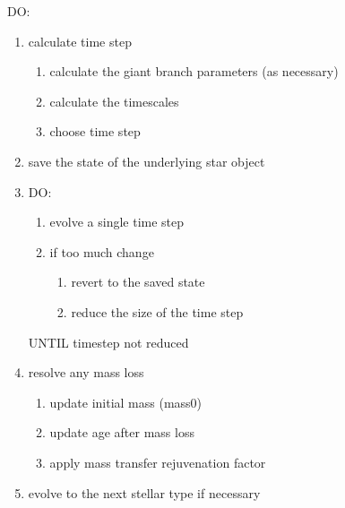\tabto{2em}DO:

\hfill
\begin{minipage}{\dimexpr\textwidth-4em}
    \begin{enumerate}
        \item {
            calculate time step
            \begin{enumerate}
                \item {calculate the giant branch parameters (as necessary)}
                \item {calculate the timescales}
                \item {choose time step}
            \end{enumerate}
        }
 
        \item {save the state of the underlying star object}

        \item {
            DO:

            \hfill
            \begin{minipage}{\dimexpr\textwidth-4em}
                \begin{enumerate}
                    \item {evolve a single time step}
                
                    \item {
                        if too much change
                        \begin{enumerate}
                        \item{revert to the saved state}
                        \item{reduce the size of the time step}
                        \end{enumerate}
                    }
                \end{enumerate}
            \end{minipage}

            UNTIL timestep not reduced
        }
  
        \item {
            resolve any mass loss
            \begin{enumerate}
                \item {update initial mass (mass0)}
                \item {update age after mass loss}
                \item {apply mass transfer rejuvenation factor}
            \end{enumerate}
        }
 
        \item { evolve to the next stellar type if necessary }

    \end{enumerate}
\end{minipage}

